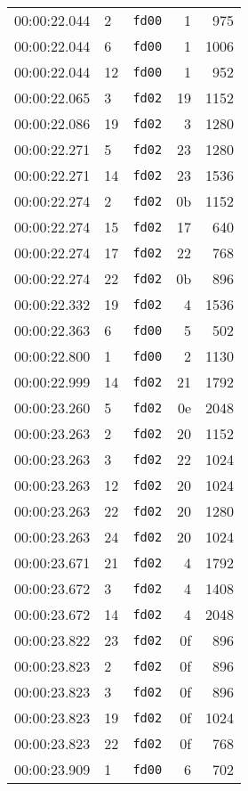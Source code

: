 \documentclass{article}
\begin{document}
\begin{longtable}{lllrr}
00:00:22.044 & 2 & \texttt{fd00} & 1 & 975 \\
00:00:22.044 & 6 & \texttt{fd00} & 1 & 1006 \\
00:00:22.044 & 12 & \texttt{fd00} & 1 & 952 \\
00:00:22.065 & 3 & \texttt{fd02} & 19 & 1152 \\
00:00:22.086 & 19 & \texttt{fd02} & 3 & 1280 \\
00:00:22.271 & 5 & \texttt{fd02} & 23 & 1280 \\
00:00:22.271 & 14 & \texttt{fd02} & 23 & 1536 \\
00:00:22.274 & 2 & \texttt{fd02} & 0b & 1152 \\
00:00:22.274 & 15 & \texttt{fd02} & 17 & 640 \\
00:00:22.274 & 17 & \texttt{fd02} & 22 & 768 \\
00:00:22.274 & 22 & \texttt{fd02} & 0b & 896 \\
00:00:22.332 & 19 & \texttt{fd02} & 4 & 1536 \\
00:00:22.363 & 6 & \texttt{fd00} & 5 & 502 \\
00:00:22.800 & 1 & \texttt{fd00} & 2 & 1130 \\
00:00:22.999 & 14 & \texttt{fd02} & 21 & 1792 \\
00:00:23.260 & 5 & \texttt{fd02} & 0e & 2048 \\
00:00:23.263 & 2 & \texttt{fd02} & 20 & 1152 \\
00:00:23.263 & 3 & \texttt{fd02} & 22 & 1024 \\
00:00:23.263 & 12 & \texttt{fd02} & 20 & 1024 \\
00:00:23.263 & 22 & \texttt{fd02} & 20 & 1280 \\
00:00:23.263 & 24 & \texttt{fd02} & 20 & 1024 \\
00:00:23.671 & 21 & \texttt{fd02} & 4 & 1792 \\
00:00:23.672 & 3 & \texttt{fd02} & 4 & 1408 \\
00:00:23.672 & 14 & \texttt{fd02} & 4 & 2048 \\
00:00:23.822 & 23 & \texttt{fd02} & 0f & 896 \\
00:00:23.823 & 2 & \texttt{fd02} & 0f & 896 \\
00:00:23.823 & 3 & \texttt{fd02} & 0f & 896 \\
00:00:23.823 & 19 & \texttt{fd02} & 0f & 1024 \\
00:00:23.823 & 22 & \texttt{fd02} & 0f & 768 \\
00:00:23.909 & 1 & \texttt{fd00} & 6 & 702 \\

\end{longtable}
\end{document}
